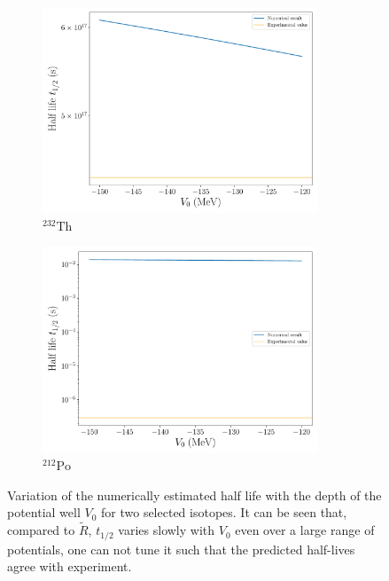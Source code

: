 \documentclass[a4paper,DIV=12,english]{scrartcl}
\begin{document}
\begin{figure}
    \centering
    \begin{subfigure}{0.49\textwidth}
        \centering
        \includegraphics[width=0.9\textwidth]{../plots/V0_dependence/V0_th232.pdf}
        \caption{$^{232}\text{Th}$}
        \label{subfig:v0_th232}
    \end{subfigure}
    \begin{subfigure}{0.49\textwidth}
        \centering
        \includegraphics[width=0.9\textwidth]{../plots/V0_dependence/V0_po212.pdf}
        \caption{$^{212}\text{Po}$}
        \label{subfig:v0_po212}
    \end{subfigure}
    \caption{Variation of the numerically estimated half life with the depth of the potential well $V_0$ for two selected isotopes. It can be seen that, compared to $\tilde R$, $t_{1/2}$ varies slowly with $V_0$ even over a large range of potentials, one can not tune it such that the predicted half-lives agree with experiment.}
    \label{fig:v0}
\end{figure}
\end{document}
